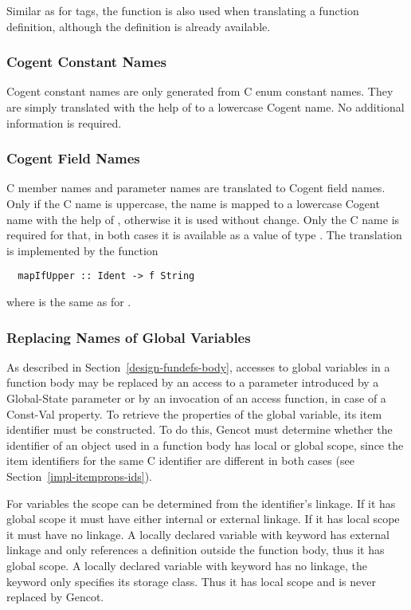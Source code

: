 Similar as for tags, the function is also used when translating a function definition, although the 
definition is already available.

\subsubsection{Cogent Constant Names}

Cogent constant names are only generated from C enum constant names. They are simply translated
with the help of  to a lowercase Cogent name. No additional information is required.

\subsubsection{Cogent Field Names}

C member names and parameter names are translated to Cogent field names. Only if the C name is
uppercase, the name is mapped to a lowercase Cogent name with the help of , 
otherwise it is used without change. Only the C name is required for that, in both cases it is
available as a value of type . The translation is implemented by the function
\begin{verbatim}
  mapIfUpper :: Ident -> f String
\end{verbatim}
where  is the same as for .

\subsubsection{Replacing Names of Global Variables}

As described in Section~\ref{design-fundefs-body}, accesses to global variables in a function body may 
be replaced by an access to a parameter introduced by a Global-State parameter or by an invocation of an 
access function, in case of a Const-Val property. To retrieve the properties of the global variable, its item
identifier must be constructed. To do this, Gencot must determine whether the identifier of an object 
used in a function body has local or global scope, since the item identifiers for the same C identifier
are different in both cases (see Section~\ref{impl-itemprops-ids}).

For variables the scope can be determined from the identifier's linkage.
If it has global scope it must have either internal or external linkage. If it has local scope it must have no
linkage. A locally declared variable with keyword  has external linkage and only references a 
definition outside the function body, thus it has global scope. A locally declared variable 
with keyword  has no linkage, the keyword only specifies its storage class. Thus it has local scope
and is never replaced by Gencot.

